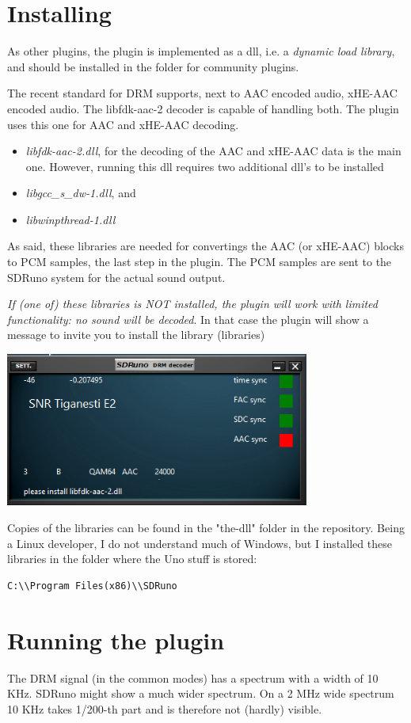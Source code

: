 \documentclass[10pt]{article}
\begin{document}
\section{Installing}
As other plugins, the plugin is implemented as a dll, i.e. a {\em dynamic 
load library}, and should be installed in the folder for community plugins.
\par
The recent standard for DRM supports, next to AAC encoded audio, xHE-AAC 
encoded audio. The libfdk-aac-2 decoder is capable of handling both.
The plugin uses this one for AAC and xHE-AAC decoding.
\begin{itemize}
\item
{\em libfdk-aac-2.dll}, for the decoding of the AAC and xHE-AAC data is the main one.
However, running this dll requires two additional dll's to be installed
\item {\em libgcc\_s\_dw-1.dll}, and
\item {\em libwinpthread-1.dll}
\end{itemize}
As said, these libraries are needed for convertings the AAC
(or xHE-AAC) blocks to PCM samples, the last step in the
plugin. The PCM samples are sent to the SDRuno system for the
actual sound output.
\par
{\em If (one of) these libraries is NOT installed, the plugin will work
with limited functionality: no sound will be decoded}.
In that case the plugin will
show a message to invite you to install the library (libraries)

\includegraphics[width=100mm]{lib-not-found.png}

Copies of the libraries can be found in the "the-dll" folder
in the repository.
Being a Linux developer, I do not understand much of Windows, but I
installed these libraries in the folder
where the Uno stuff is stored:
\begin{verbatim}
C:\\Program Files(x86)\\SDRuno
\end{verbatim}
\section{Running the plugin}
The DRM signal (in the common modes)
has a spectrum with a width of 10 KHz. SDRuno might show
a much wider spectrum. On a 2 MHz wide spectrum 10 KHz takes 1/200-th part
and is therefore not (hardly) visible.
\end{document}
